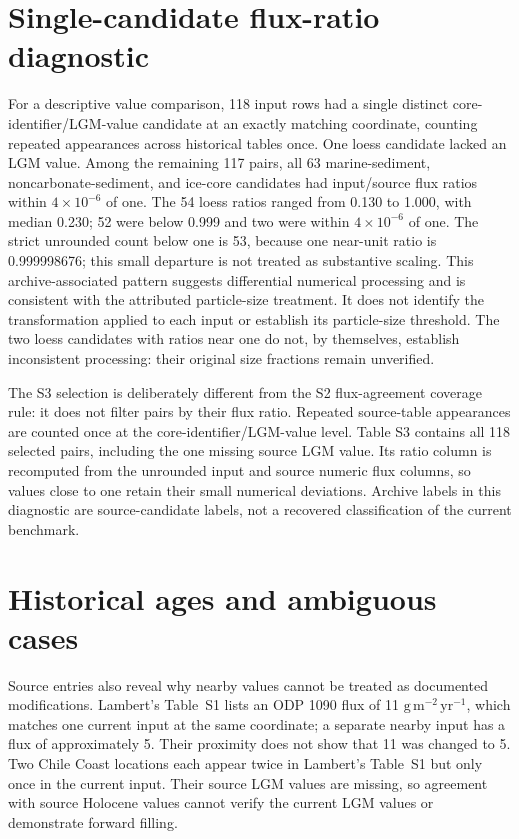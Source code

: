 \documentclass[11pt,a4paper]{article}
\begin{document}
\section{Single-candidate flux-ratio diagnostic}
For a descriptive value comparison, 118 input rows had a single distinct core-identifier/LGM-value candidate at an exactly matching coordinate, counting repeated appearances across historical tables once. One loess candidate lacked an LGM value. Among the remaining 117 pairs, all 63 marine-sediment, noncarbonate-sediment, and ice-core candidates had input/source flux ratios within $4\times10^{-6}$ of one. The 54 loess ratios ranged from 0.130 to 1.000, with median 0.230; 52 were below 0.999 and two were within $4\times10^{-6}$ of one. The strict unrounded count below one is 53, because one near-unit ratio is 0.999998676; this small departure is not treated as substantive scaling. This archive-associated pattern suggests differential numerical processing and is consistent with the attributed particle-size treatment. It does not identify the transformation applied to each input or establish its particle-size threshold. The two loess candidates with ratios near one do not, by themselves, establish inconsistent processing: their original size fractions remain unverified.

The S3 selection is deliberately different from the S2 flux-agreement coverage rule: it does not filter pairs by their flux ratio. Repeated source-table appearances are counted once at the core-identifier/LGM-value level. Table S3 contains all 118 selected pairs, including the one missing source LGM value. Its ratio column is recomputed from the unrounded input and source numeric flux columns, so values close to one retain their small numerical deviations. Archive labels in this diagnostic are source-candidate labels, not a recovered classification of the current benchmark.

\section{Historical ages and ambiguous cases}
Source entries also reveal why nearby values cannot be treated as documented modifications. Lambert's Table~S1 lists an ODP 1090 flux of 11 $\mathrm{g\,m^{-2}\,yr^{-1}}$, which matches one current input at the same coordinate; a separate nearby input has a flux of approximately 5. Their proximity does not show that 11 was changed to 5. Two Chile Coast locations each appear twice in Lambert's Table~S1 but only once in the current input. Their source LGM values are missing, so agreement with source Holocene values cannot verify the current LGM values or demonstrate forward filling.
\end{document}
